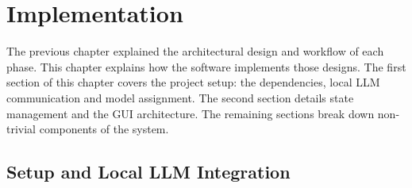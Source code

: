 \chapter{Implementation}
The previous chapter explained the architectural design and workflow of each phase.
This chapter explains how the software implements those designs.
The first section of this chapter covers the project setup: the dependencies, local LLM communication and model assignment.
The second section details state management and the GUI architecture.
The remaining sections break down non-trivial components of the system.

\section{Setup and Local LLM Integration}

